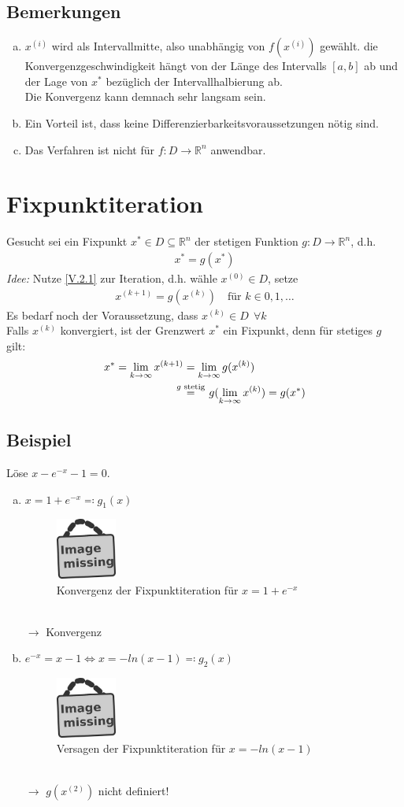 \documentclass[ngerman,fontsize=11pt, paper=a4, parskip=half, titlepage=true, toc=bib]{scrbook}
\newcommand{\R}{\mathds{R}}
\newcommand{\sectione}[1]{\section{#1} \setcounter{equation}{0}}
\newcommand{\imagemissing}[1]{
	\begin{figure}
		\parbox{\linewidth}{
			\centering
			\includegraphics[width=2cm]{images/image_missing.jpg}
		}
		\caption{#1}
	\end{figure}
}
\begin{document}
	\subsection{Bemerkungen}
	\begin{enumerate}[a)]
		\item $x^{(i)} $ wird als Intervallmitte, also unabhängig von $f(x^{(i)})$
		gewählt. die Konvergenzgeschwindigkeit hängt von der Länge des Intervalls $[a,b]$ ab
		und der Lage von $x^{*}$ bezüglich der Intervallhalbierung ab. \\
		Die Konvergenz kann demnach sehr langsam sein.
		\item Ein Vorteil ist, dass keine Differenzierbarkeitsvoraussetzungen nötig sind.
		\item Das Verfahren ist nicht für $f:D\longrightarrow \R^n$ anwendbar.
	\end{enumerate}
	
	
	\sectione{Fixpunktiteration}
	Gesucht sei ein Fixpunkt $x^{*}\in D\subseteq \R^n$ der stetigen Funktion
	$g:D\rightarrow\R^n$, d.h.
	\begin{gather}
		x^{*} = g(x^{*}) \label{V.2.1}
	\end{gather}
	\textit{Idee:}
	Nutze \eqref{V.2.1} zur Iteration, d.h. wähle $x^{(0)}\in D$,
	setze 
	\begin{gather}
		x^{(k+1)} = g(x^{(k)})  \quad \text{für } k\in 0, 1, \dotsc
		\label{V.2.2}
	\end{gather}
	Es bedarf noch der Voraussetzung, dass $x^{(k)}\in D~~ \forall k$ \\
	Falls $x^{(k)}$ konvergiert, ist der Grenzwert $x^{*}$ ein Fixpunkt,
	denn für stetiges $g$ gilt:
	\begin{align} \nonumber
		x^{*} = \lim_{k\rightarrow \infty}x^{(k+1)} &= \lim_{k\rightarrow \infty}g(x^{(k)}) \\
		     & \overset{\mathclap{g \text{ stetig}} }{=}\quad g(\lim_{k\rightarrow \infty}x^{(k)}) = g(x^{*})
		     \label{V.2.3}
	\end{align}
	
	\subsection{Beispiel}
	Löse $x-e^{-x}-1 = 0$.
	\begin{enumerate}[a)]
		\item $x=1+e^{-x} \eqqcolon g_1(x)$
		\imagemissing{Konvergenz der Fixpunktiteration für $x=1+e^{-x}$}\\
		$\longrightarrow$ Konvergenz
		\item $e^{-x} = x-1   \Leftrightarrow x= -ln(x-1) \eqqcolon g_2(x)$
		\imagemissing{Versagen der Fixpunktiteration für $x=-ln(x-1)$}\\
		$\longrightarrow$ $g(x^{(2)}) $ nicht definiert!
	\end{enumerate}
	
\end{document}
